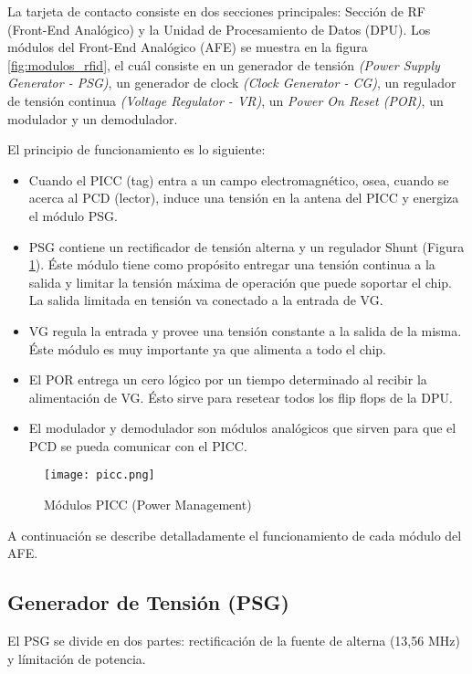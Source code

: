 La tarjeta de contacto consiste en dos secciones principales: Sección de RF (Front-End Analógico) y la Unidad de Procesamiento de Datos (DPU). Los módulos del Front-End Analógico (AFE) se muestra en la figura \ref{fig:modulos_rfid}, el cuál consiste en un generador de tensión \textit{(Power Supply Generator - PSG)}, un generador de clock \textit{(Clock Generator - CG)}, un regulador de tensión continua \textit{(Voltage Regulator - VR)}, un \textit{Power On Reset (POR)}, un modulador y un demodulador.

El principio de funcionamiento es lo siguiente: 

\begin{itemize}
\item Cuando el PICC (tag) entra a un campo electromagnético, osea, cuando se acerca al PCD (lector), induce una tensión en la antena del PICC y energiza el módulo PSG. 
\item PSG contiene un rectificador de tensión alterna y un regulador Shunt (Figura \ref{fig:modulos_picc}). Éste módulo tiene como propósito entregar una tensión continua a la salida y limitar la tensión máxima de operación que puede soportar el chip. La salida limitada en tensión va conectado a la entrada de VG. 
\item VG regula la entrada y provee una tensión constante a la salida de la misma. Éste módulo es muy importante ya que alimenta a todo el chip. 
\item El POR entrega un cero lógico por un tiempo determinado al recibir la alimentación de VG. Ésto sirve para resetear todos los flip flops de la DPU. 
\item El modulador y demodulador son módulos analógicos que sirven para que el PCD se pueda comunicar con el PICC.
\end{itemize}

\begin{figure}[H]
\centering
\texttt{[image: picc.png]}
\caption{Módulos PICC (Power Management)}
\label{fig:modulos_picc}
\end{figure}

A continuación se describe detalladamente el funcionamiento de cada módulo del AFE.


\subsection{Generador de Tensión (PSG)}

El PSG se divide en dos partes: rectificación de la fuente de alterna (13,56 MHz) y límitación de potencia. 

